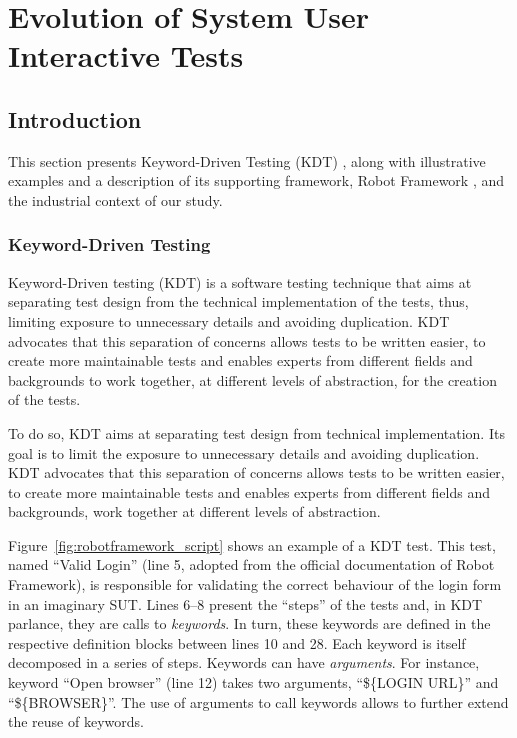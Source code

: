 \chapter{Evolution of System User Interactive Tests}
\section{Introduction}
\label{sec:evolution-introduction}

This section presents Keyword-Driven Testing (KDT) , along with illustrative examples and a description of its supporting framework, Robot Framework \cite{RobotFramework2020}, and the industrial context of our study.

\subsection{Keyword-Driven Testing}
\label{kdt}

Keyword-Driven testing (KDT) is a software testing technique that aims at separating test design from the technical implementation of the tests, thus, limiting exposure to unnecessary details and avoiding duplication. KDT advocates that this separation of concerns allows tests to be written easier, to create more maintainable tests and enables experts from different fields and backgrounds to work together, at different levels of abstraction, for the creation of the tests.

To do so, KDT\cite{Tang2008} aims at separating test design from technical implementation. Its goal is to limit the exposure to unnecessary details and avoiding duplication. KDT advocates that this separation of concerns allows tests to be written easier, to create more maintainable tests and enables experts from different fields and backgrounds, work together at different levels of abstraction. 

Figure~\ref{fig:robotframework_script} shows an example of a KDT test. This test, named ``Valid Login'' (line 5, adopted from the official documentation of Robot Framework), is responsible for validating the correct behaviour of the login form in an imaginary SUT. Lines 6--8 present the ``steps'' of the tests and, in KDT parlance, they are calls to \emph{keywords}. In turn, these keywords are defined in the respective definition blocks between lines 10 and 28. Each keyword is itself decomposed in a series of steps. Keywords can have \emph{arguments}. For instance, keyword ``Open browser'' (line 12) takes two arguments, ``\$\{LOGIN URL\}'' and ``\$\{BROWSER\}''. The use of arguments to call keywords allows to further extend the reuse of keywords.

